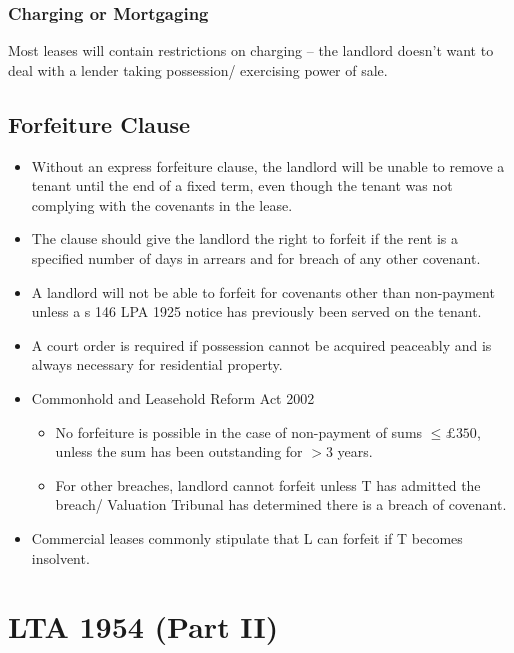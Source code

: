 \documentclass[
]{article}
\providecommand{\tightlist}{%
  \setlength{\itemsep}{0pt}\setlength{\parskip}{0pt}}
\begin{document}
\hypertarget{charging-or-mortgaging}{%
\subsubsection{Charging or Mortgaging}\label{charging-or-mortgaging}}

Most leases will contain restrictions on charging -- the landlord
doesn't want to deal with a lender taking possession/ exercising power
of sale.

\hypertarget{forfeiture-clause}{%
\subsection{Forfeiture Clause}\label{forfeiture-clause}}

\begin{itemize}
\tightlist
\item
  Without an express forfeiture clause, the landlord will be unable to
  remove a tenant until the end of a fixed term, even though the tenant
  was not complying with the covenants in the lease.
\item
  The clause should give the landlord the right to forfeit if the rent
  is a specified number of days in arrears and for breach of any other
  covenant.
\item
  A landlord will not be able to forfeit for covenants other than
  non-payment unless a s 146 LPA 1925 notice has previously been served
  on the tenant.
\item
  A court order is required if possession cannot be acquired peaceably
  and is always necessary for residential property.
\item
  Commonhold and Leasehold Reform Act 2002

  \begin{itemize}
  \tightlist
  \item
    No forfeiture is possible in the case of non-payment of sums
    {\(\leq \pounds 350\)}, unless the sum has been outstanding for
    {\(> 3\)} years.
  \item
    For other breaches, landlord cannot forfeit unless T has admitted
    the breach/ Valuation Tribunal has determined there is a breach of
    covenant.
  \end{itemize}
\item
  Commercial leases commonly stipulate that L can forfeit if T becomes
  insolvent.
\end{itemize}

\hypertarget{lta-1954-part-ii}{%
\section{LTA 1954 (Part II)}\label{lta-1954-part-ii}}
\end{document}
